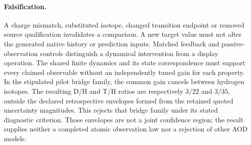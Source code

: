 \paragraph{Falsification.}
A charge mismatch, substituted isotope, changed transition endpoint or removed
source qualification invalidates a comparison. A new target value must not
alter the generated native history or prediction inputs. Matched feedback and
passive-observation controls distinguish a dynamical intervention from a
display operation. The shared finite dynamics and its state correspondence
must support every claimed observable without an independently tuned gain for
each property. In the stipulated pilot bridge family, the common gain cancels
between hydrogen isotopes. The resulting D/H and T/H ratios are respectively
\(3/22\) and \(3/35\), outside the declared retrospective envelopes formed
from the retained quoted uncertainty magnitudes. This rejects that bridge family
under its stated diagnostic criterion. Those envelopes are not a joint
confidence region; the result supplies neither a completed atomic observation
law nor a rejection of other AOD models.


